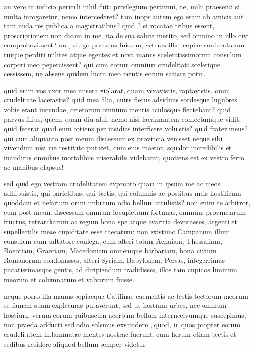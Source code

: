  an vero in iudicio periculi nihil fuit: privilegium pertimui, ne, mihi praesenti si multa inrogaretur, nemo intercederet? tam inops autem ego eram ab amicis aut tam nuda res publica a magistratibus? quid ? si vocatae tribus essent, proscriptionem non dicam in me, ita de sua salute merito, sed omnino in ullo civi comprobavissent? an , si ego praesens fuissem, veteres illae copiae coniuratorum tuique perditi milites atque egentes et nova manus sceleratissimorum consulum corpori meo pepercissent? qui cum eorum omnium crudelitati scelerique cessissem, ne absens quidem luctu meo mentis eorum satiare potui.

 quid enim vos uxor mea misera violarat, quam vexavistis, raptavistis, omni crudelitate lacerastis? quid mea filia, cuius fletus adsiduus sordesque lugubres vobis erant iucundae, ceterorum omnium mentis oculosque flectebant? quid parvus filius, quem, quam diu afui, nemo nisi lacrimantem confectumque vidit: quid fecerat quod eum totiens per insidias interficere voluistis? quid frater meus? qui cum aliquanto post meum discessum ex provincia venisset neque sibi vivendum nisi me restituto putaret, cum eius maeror, squalor incredibilis et inauditus omnibus mortalibus miserabilis videbatur, quotiens est ex vestro ferro ac manibus elapsus!

 sed quid ego vestram crudelitatem exprobro quam in ipsum me ac meos adhibuistis, qui parietibus, qui tectis, qui columnis ac postibus meis hostificum quoddam et nefarium omni imbutum odio bellum intulistis? non enim te arbitror, cum post meum discessum omnium locupletium fortunas, omnium provinciarum fructus, tetrarcharum ac regum bona spe atque avaritia devorasses, argenti et supellectilis meae cupiditate esse caecatum: non existimo Campanum illum consulem cum saltatore conlega, cum alteri totam Achaiam, Thessaliam, Boeotiam, Graeciam, Macedoniam omnemque barbariam, bona civium Romanorum condonasses, alteri Syriam, Babylonem, Persas, integerrimas pacatissimasque gentis, ad diripiendum tradidisses, illos tam cupidos liminum meorum et columnarum et valvarum fuisse.

 neque porro illa manus copiaeque Catilinae caementis ac testis tectorum meorum se famem suam expleturas putaverunt; sed ut hostium urbes, nec omnium hostium, verum eorum quibuscum acerbum bellum internecivumque suscepimus, non praeda adducti sed odio solemus exscindere , quod, in quos propter eorum crudelitatem inflammatae mentes nostrae fuerunt, cum horum etiam tectis et sedibus residere aliquod bellum semper videtur

